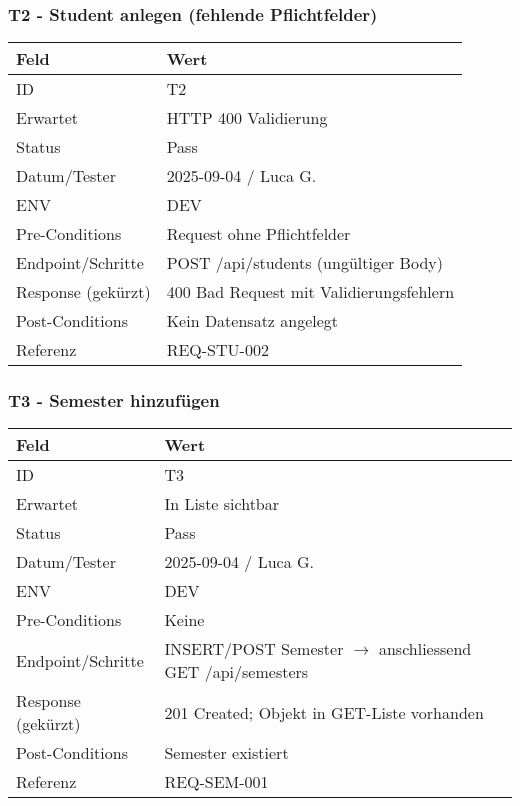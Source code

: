 \documentclass[12pt,a4paper]{article}
\begin{document}
    \subsubsection{T2 - Student anlegen (fehlende Pflichtfelder)}
    {\small
        \begin{tabularx}{\textwidth}{|p{3.2cm}|X|}
            \hline
            \textbf{Feld} & \textbf{Wert} \\ \hline
            ID & T2 \\ \hline
            Erwartet & HTTP 400 Validierung \\ \hline
            Status & Pass \\ \hline
            Datum/Tester & 2025-09-04 / Luca G. \\ \hline
            ENV & DEV \\ \hline
            Pre-Conditions & Request ohne Pflichtfelder \\ \hline
            Endpoint/Schritte & POST /api/students (ungültiger Body) \\ \hline
            Response (gekürzt) & 400 Bad Request mit Validierungsfehlern \\ \hline
            Post-Conditions & Kein Datensatz angelegt \\ \hline
            Referenz & REQ-STU-002 \\ \hline
        \end{tabularx}
    }

    \subsubsection{T3 - Semester hinzufügen}
    {\small
        \begin{tabularx}{\textwidth}{|p{3.2cm}|X|}
            \hline
            \textbf{Feld} & \textbf{Wert} \\ \hline
            ID & T3 \\ \hline
            Erwartet & In Liste sichtbar \\ \hline
            Status & Pass \\ \hline
            Datum/Tester & 2025-09-04 / Luca G. \\ \hline
            ENV & DEV \\ \hline
            Pre-Conditions & Keine \\ \hline
            Endpoint/Schritte & INSERT/POST Semester $\rightarrow$ anschliessend GET /api/semesters \\ \hline
            Response (gekürzt) & 201 Created; Objekt in GET-Liste vorhanden \\ \hline
            Post-Conditions & Semester existiert \\ \hline
            Referenz & REQ-SEM-001 \\ \hline
        \end{tabularx}
    }
\end{document}

